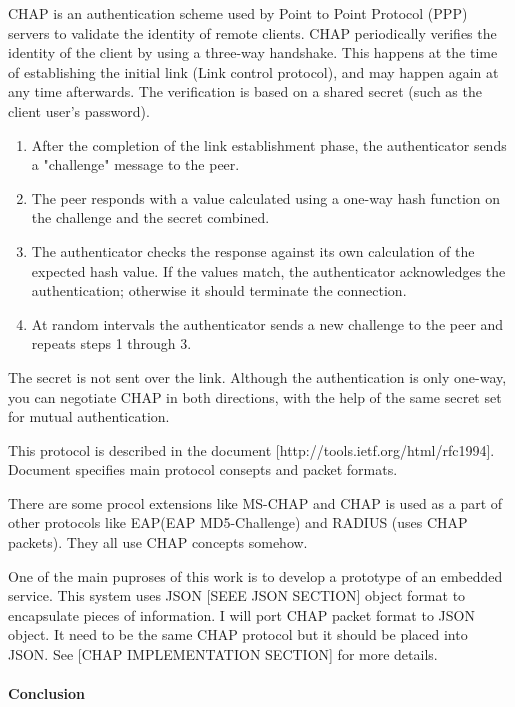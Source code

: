 CHAP is an authentication scheme used by Point to Point Protocol (PPP) servers to validate the identity of remote clients. 
CHAP periodically verifies the identity of the client by using a three-way handshake. 
This happens at the time of establishing the initial link (Link control protocol), and may happen again at any time afterwards.
The verification is based on a shared secret (such as the client user's
password).
\begin{enumerate}
  \item After the completion of the link establishment phase, the authenticator
  sends a "challenge" message to the peer.
  \item The peer responds with a value calculated using a one-way hash function
  on the challenge and the secret combined.
  \item The authenticator checks the response against its own calculation of the
  expected hash value. If the values match, the authenticator acknowledges the authentication; otherwise it should terminate the connection.
  \item At random intervals the authenticator sends a new challenge to the peer
  and repeats steps 1 through 3.
\end{enumerate}

The secret is not sent over the link.
Although the authentication is only one-way, you can negotiate CHAP in both directions, 
with the help of the same secret set for mutual authentication.

This protocol is described in the document [http://tools.ietf.org/html/rfc1994].
Document specifies main protocol consepts and packet formats.

There are some procol extensions like MS-CHAP and CHAP is used
as a part of other protocols like EAP(EAP MD5-Challenge) and RADIUS (uses CHAP
packets). They all use CHAP concepts somehow. 

One of the main puproses of this work is to develop a prototype of an embedded
service. This system uses JSON [SEEE JSON SECTION] object format to encapsulate
pieces of information. I will port CHAP packet format to JSON object. It need to
be the same CHAP protocol but it should be placed into JSON. See
[CHAP IMPLEMENTATION SECTION] for more details.



\paragraph{Conclusion}

